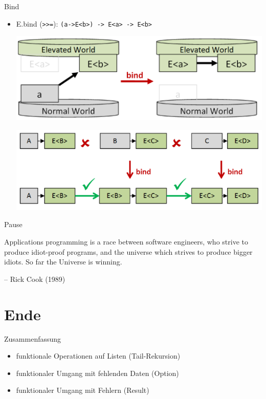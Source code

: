 \documentclass[t]{beamer}
\begin{document}
\begin{frame}[label={sec:org5b5ab90},fragile]{Bind}
 \begin{itemize}
\item E.bind (\texttt{>{}>{}=}): \texttt{(a->E<b>) -> E<a> -> E<b>}
\begin{center}
\includegraphics[width=.9\linewidth]{./../img/vgfp_bind.png}
\end{center}
\begin{center}
\includegraphics[width=.9\linewidth]{./../img/vgfp_bind_composition.png}
\end{center}
\end{itemize}
\end{frame}

\begin{frame}[label={sec:org8f569bf}]{Pause}
\begin{block}{}
Applications programming is a race between software engineers, 
who strive to produce idiot-proof programs, 
and the universe which strives to produce bigger idiots. 
So far the Universe is winning.

\null\hfill-- Rick Cook (1989)
\end{block}
\end{frame}

\section{Ende }
\label{sec:org0c5a780}
\begin{frame}[label={sec:orge2f1d4c}]{Zusammenfassung}
\begin{itemize}
\item funktionale Operationen auf Listen (Tail-Rekursion)
\item funktionaler Umgang mit fehlenden Daten (Option)
\item funktionaler Umgang mit Fehlern (Result)
\end{itemize}
\end{frame}
\end{document}

